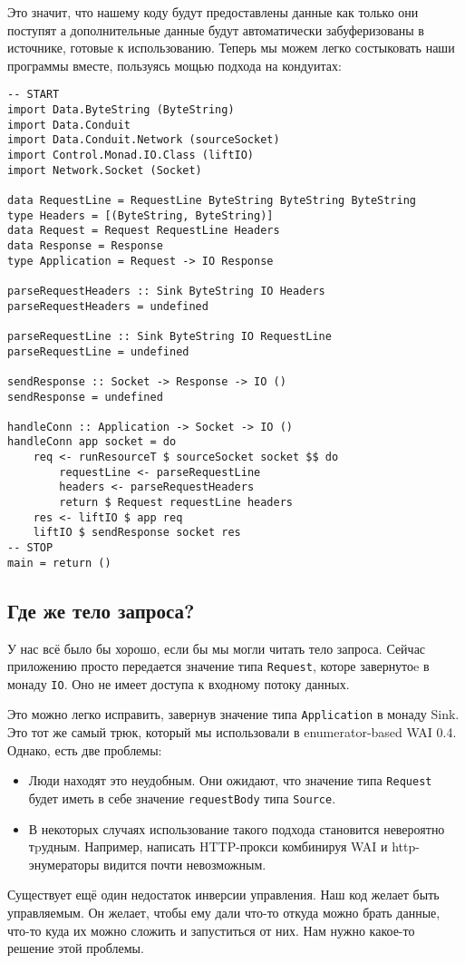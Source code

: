 Это значит, что нашему коду будут предоставлены данные как только они поступят 
а дополнительные данные будут автоматически забуферизованы в источнике, 
готовые к использованию. Теперь мы можем легко состыковать наши программы 
вместе, пользуясь мощью подхода на кондуитах:
\begin{lstlisting}
-- START
import Data.ByteString (ByteString)
import Data.Conduit
import Data.Conduit.Network (sourceSocket)
import Control.Monad.IO.Class (liftIO)
import Network.Socket (Socket)

data RequestLine = RequestLine ByteString ByteString ByteString
type Headers = [(ByteString, ByteString)]
data Request = Request RequestLine Headers
data Response = Response
type Application = Request -> IO Response

parseRequestHeaders :: Sink ByteString IO Headers
parseRequestHeaders = undefined

parseRequestLine :: Sink ByteString IO RequestLine
parseRequestLine = undefined

sendResponse :: Socket -> Response -> IO ()
sendResponse = undefined

handleConn :: Application -> Socket -> IO ()
handleConn app socket = do
    req <- runResourceT $ sourceSocket socket $$ do
        requestLine <- parseRequestLine
        headers <- parseRequestHeaders
        return $ Request requestLine headers
    res <- liftIO $ app req
    liftIO $ sendResponse socket res
-- STOP
main = return ()
\end{lstlisting}
\subsection{Где же тело запроса?}
У нас всё было бы хорошо, если бы мы могли читать тело запроса. Сейчас
приложению просто передается значение типа \lstinline'Request', которе 
завернутоe в монаду \lstinline'IO'. 
Оно не имеет доступа к входному потоку данных.

Это можно легко исправить, завернув значение типа \lstinline'Application' в монаду Sink. 
Это тот же самый трюк, который мы использовали в enumerator-based WAI 0.4. 
Однако, есть две проблемы:

\begin{itemize}
\item Люди находят это неудобным. Они ожидают, что значение типа 
\lstinline'Request' будет иметь в себе значение \lstinline'requestBody' типа 
\lstinline'Source'.
\item В некоторых случаях использование такого подхода становится невероятно 
тpудным. Например, написать HTTP-прокси комбинируя WAI и http-энумераторы 
видится почти невозможным.
\end{itemize}
Существует ещё один недостаток инверсии управления. Наш код желает быть 
управляемым. Он желает, чтобы ему дали что-то откуда можно брать данные, что-то 
куда их можно сложить и запуститься от них. Нам нужно какое-то решение этой проблемы.

